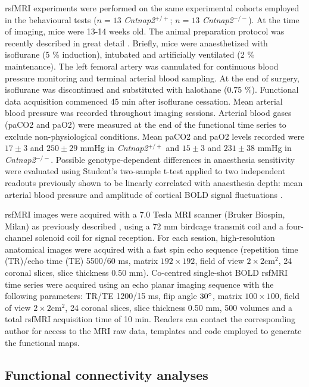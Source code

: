 rsfMRI experiments were performed on the same experimental cohorts employed in
the behavioural tests ($n = 13$ \textit{\textit{Cntnap2}}$^{+/+}$; $n = 13$ \textit{\textit{Cntnap2}}$^{-/-}$). At the time of
imaging, mice were 13-14 weeks old. The animal preparation protocol was recently
described in great detail \parencite{ferrari2012, sforazzini2016}. Briefly, mice
were anaesthetized with isoflurane (5 \% induction), intubated and artificially
ventilated (2 \% maintenance). The left femoral artery was cannulated for
continuous blood pressure monitoring and terminal arterial blood sampling. At
the end of surgery, isoflurane was discontinued and substituted with halothane
(0.75 \%). Functional data acquisition commenced 45 min after isoflurane
cessation. Mean arterial blood pressure was recorded throughout imaging
sessions. Arterial blood gases (paCO2 and paO2) were measured at the end of the
functional time series to exclude non-physiological conditions. Mean paCO2 and
paO2 levels recorded were $17 \pm 3$ and $250 \pm 29$ mmHg in \textit{\textit{Cntnap2}}$^{+/+}$ and $15
\pm 3$ and $231 \pm 38$ mmHg in \textit{\textit{Cntnap2}}$^{-/-}$. Possible genotype-dependent
differences in anaesthesia sensitivity were evaluated using Student’s two-sample
t-test applied to two independent readouts previously shown to be linearly
correlated with anaesthesia depth: mean arterial blood pressure and amplitude of
cortical BOLD signal fluctuations \parencite{steffey2003, liu2011, zhan2014}.

rsfMRI images were acquired with a 7.0 Tesla MRI scanner (Bruker Biospin, Milan)
as previously described \parencite{liska2015}, using a 72 mm birdcage transmit
coil and a four-channel solenoid coil for signal reception. For each session,
high-resolution anatomical images were acquired with a fast spin echo sequence
(repetition time (TR)/echo time (TE) 5500/60 ms, matrix $192 \times 192$, field
of view $2 \times 2 \text{cm}^2$, 24 coronal slices, slice thickness 0.50 mm).
Co-centred single-shot BOLD rsfMRI time series were acquired using an echo
planar imaging sequence with the following parameters: TR/TE 1200/15 ms, flip
angle $30\degree$, matrix $100 \times 100$, field of view $2 \times 2 \text{cm}^2$, 24
coronal slices, slice thickness 0.50 mm, 500 volumes and a total rsfMRI
acquisition time of 10 min. Readers can contact the corresponding author for
access to the MRI raw data, templates and code employed to generate the
functional maps.

\subsection{Functional connectivity analyses}


